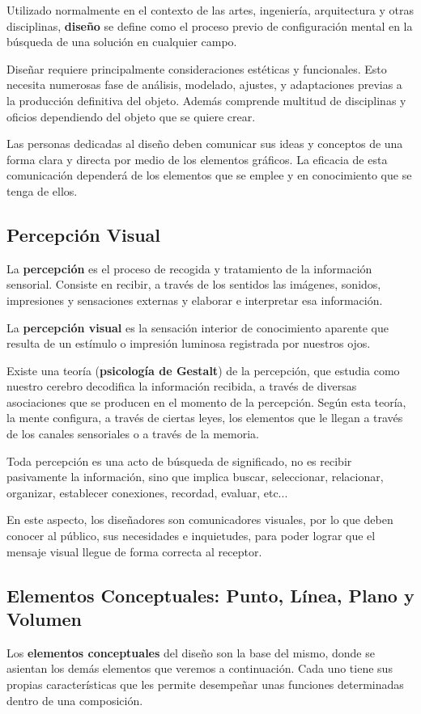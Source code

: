 Utilizado normalmente en el contexto de las artes, ingeniería, arquitectura y otras disciplinas, \textbf{diseño} se define como el proceso previo de configuración mental en la búsqueda de una solución en cualquier campo.

Diseñar requiere principalmente consideraciones estéticas y funcionales. Esto necesita numerosas fase de análisis, modelado, ajustes, y adaptaciones previas a la producción definitiva del objeto. Además comprende multitud de disciplinas y oficios dependiendo del objeto que se quiere crear.

Las personas dedicadas al diseño deben comunicar sus ideas y conceptos de una forma clara y directa por medio de los elementos gráficos. La eficacia de esta comunicación dependerá de los elementos que se emplee y en conocimiento que se tenga de ellos.

\subsection{Percepción Visual}

La \textbf{percepción} es el proceso de recogida y tratamiento de la información sensorial. Consiste en recibir, a través de los sentidos las imágenes, sonidos, impresiones y sensaciones externas y elaborar e interpretar esa información.

La \textbf{percepción visual} es la sensación interior de conocimiento aparente que resulta de un estímulo o impresión luminosa registrada por nuestros ojos.

Existe una teoría (\textbf{psicología de Gestalt}) de la percepción, que estudia como nuestro cerebro decodifica la información recibida, a través de diversas asociaciones que se producen en el momento de la percepción. Según esta teoría, la mente configura, a través de ciertas leyes, los elementos que le llegan a través de los canales sensoriales o a través de la memoria.

Toda percepción es una acto de búsqueda de significado, no es recibir pasivamente la información, sino que implica buscar, seleccionar, relacionar, organizar, establecer conexiones, recordad, evaluar, etc...

En este aspecto, los diseñadores son comunicadores visuales, por lo que deben conocer al público, sus necesidades e inquietudes, para poder lograr que el mensaje visual llegue de forma correcta al receptor.

\subsection{Elementos Conceptuales: Punto, Línea, Plano y Volumen}
Los \textbf{elementos conceptuales} del diseño son la base del mismo, donde se asientan los demás elementos que veremos a continuación. Cada uno tiene sus propias características que les permite desempeñar unas funciones determinadas dentro de una composición.

